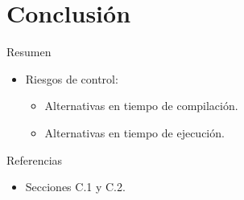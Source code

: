 \section{Conclusión}

\begin{frame}[t]{Resumen}
\begin{itemize}[<+->]
  \item Riesgos de control:
    \begin{itemize}
      \item Alternativas en tiempo de compilación.
      \item Alternativas en tiempo de ejecución.
    \end{itemize}
\end{itemize}
\end{frame}


\begin{frame}[t]{Referencias}
\begin{itemize}
  \item \bibhennessy
  Secciones C.1 y C.2.

\end{itemize}
\end{frame}
